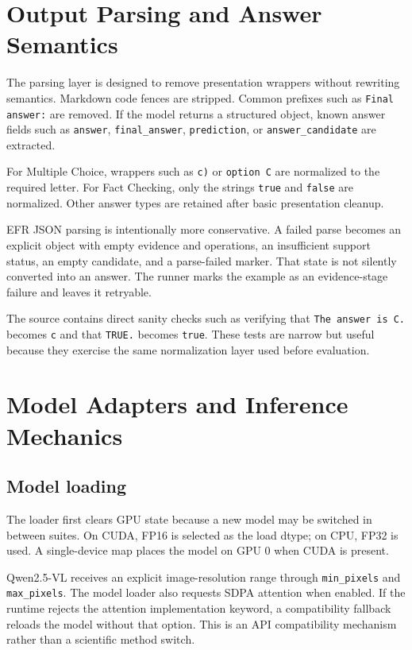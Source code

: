 \documentclass[11pt,a4paper]{article}
\newcommand{\code}[1]{\texttt{#1}}
\begin{document}
\section{Output Parsing and Answer Semantics}
The parsing layer is designed to remove presentation wrappers without rewriting semantics. Markdown code fences are stripped. Common prefixes such as \code{Final answer:} are removed. If the model returns a structured object, known answer fields such as \code{answer}, \code{final\_answer}, \code{prediction}, or \code{answer\_candidate} are extracted.

For Multiple Choice, wrappers such as \code{c)} or \code{option C} are normalized to the required letter. For Fact Checking, only the strings \code{true} and \code{false} are normalized. Other answer types are retained after basic presentation cleanup.

EFR JSON parsing is intentionally more conservative. A failed parse becomes an explicit object with empty evidence and operations, an insufficient support status, an empty candidate, and a parse-failed marker. That state is not silently converted into an answer. The runner marks the example as an evidence-stage failure and leaves it retryable.

The source contains direct sanity checks such as verifying that \code{The answer is C.} becomes \code{c} and that \code{TRUE.} becomes \code{true}. These tests are narrow but useful because they exercise the same normalization layer used before evaluation.

\section{Model Adapters and Inference Mechanics}
\subsection{Model loading}
The loader first clears GPU state because a new model may be switched in between suites. On CUDA, FP16 is selected as the load dtype; on CPU, FP32 is used. A single-device map places the model on GPU 0 when CUDA is present.

Qwen2.5-VL receives an explicit image-resolution range through \code{min\_pixels} and \code{max\_pixels}. The model loader also requests SDPA attention when enabled. If the runtime rejects the attention implementation keyword, a compatibility fallback reloads the model without that option. This is an API compatibility mechanism rather than a scientific method switch.
\end{document}
